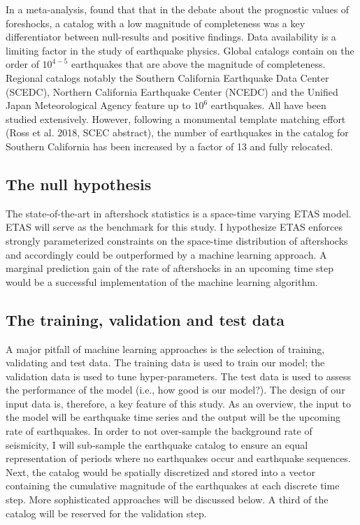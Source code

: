 \documentclass[12pt, notitlepage]{report}
\begin{document}
In a meta-analysis, \textcite{Mignan2015} found that that in the debate about the prognostic values of foreshocks, a catalog with a low magnitude of completeness was a key differentiator between null-results and positive findings. Data availability is a limiting factor in the study of earthquake physics. Global catalogs contain on the order of $10^{4-5}$ earthquakes that are above the magnitude of completeness. Regional catalogs notably the Southern California Earthquake Data Center (SCEDC), Northern California Earthquake Center (NCEDC) and the Unified Japan Meteorological Agency feature up to $10^6$ earthquakes. All have been studied extensively. However, following a monumental template matching effort (Ross et al. 2018, SCEC abstract), the number of earthquakes in the catalog for Southern California has been increased by a factor of 13 and fully relocated. 

\subsection{The null hypothesis}

The state-of-the-art in aftershock statistics is a space-time varying ETAS model. ETAS will serve as the benchmark for this study. I hypothesize ETAS enforces strongly parameterized constraints on the space-time distribution of aftershocks and accordingly could be outperformed by a machine learning approach. A marginal prediction gain of the rate of aftershocks in an upcoming time step would be a successful implementation of the machine learning algorithm.

\subsection{The training, validation and test data}

A major pitfall of machine learning approaches is the selection of training, validating and test data. The training data is used to train our model; the validation data is used to tune hyper-parameters. The test data is used to assess the performance of the model (i.e., how good is our model?). The design of our input data is, therefore, a key feature of this study. As an overview, the input to the model will be earthquake time series and the output will be the upcoming rate of earthquakes. In order to not over-sample the background rate of seismicity, I will sub-sample the earthquake catalog to ensure an equal representation of periods where no earthquakes occur and earthquake sequences. Next, the catalog would be spatially discretized and stored into a vector containing the cumulative magnitude of the earthquakes at each discrete time step. More sophisticated approaches will be discussed below. A third of the catalog will be reserved for the validation step.
\end{document}
